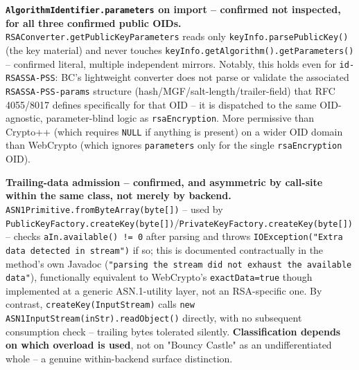 \documentclass[11pt,a4paper]{article}
\begin{document}
\textbf{\texttt{AlgorithmIdentifier.parameters} on import -- confirmed not inspected, for all three confirmed public OIDs.} \texttt{RSAConverter.getPublicKeyParameters} reads only \texttt{keyInfo.parsePublicKey()} (the key material) and never touches \texttt{keyInfo.getAlgorithm().getParameters()} -- confirmed literal, multiple independent mirrors. Notably, this holds even for \texttt{id-RSASSA-PSS}: BC's lightweight converter does not parse or validate the associated \texttt{RSASSA-PSS-params} structure (hash/MGF/salt-length/trailer-field) that RFC 4055/8017 defines specifically for that OID -- it is dispatched to the same OID-agnostic, parameter-blind logic as \texttt{rsaEncryption}. More permissive than Crypto++ (which requires \texttt{NULL} if anything is present) on a wider OID domain than WebCrypto (which ignores \texttt{parameters} only for the single \texttt{rsaEncryption} OID).

\textbf{Trailing-data admission -- confirmed, and asymmetric by call-site within the same class, not merely by backend.} \texttt{ASN1Primitive.fromByteArray(byte[])} -- used by \texttt{PublicKeyFactory.createKey(byte[])}/\texttt{PrivateKeyFactory.createKey(byte[])} -- checks \texttt{aIn.available() != 0} after parsing and throws \texttt{IOException("Extra data detected in stream")} if so; this is documented contractually in the method's own Javadoc (\texttt{"parsing the stream did not exhaust the available data"}), functionally equivalent to WebCrypto's \texttt{exactData=true} though implemented at a generic ASN.1-utility layer, not an RSA-specific one. By contrast, \texttt{createKey(InputStream)} calls \texttt{new ASN1InputStream(inStr).readObject()} directly, with no subsequent consumption check -- trailing bytes tolerated silently. \textbf{Classification depends on which overload is used}, not on "Bouncy Castle" as an undifferentiated whole -- a genuine within-backend surface distinction.
\end{document}
